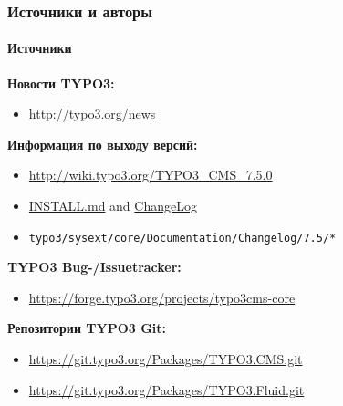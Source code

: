 \begin{frame}[fragile]
	\frametitle{Источники и авторы}
	\framesubtitle{Источники}

	\textbf{Новости TYPO3:}
		\begin{itemize}\smaller
			\item \url{http://typo3.org/news}
		\end{itemize}

	\textbf{Информация по выходу версий:}
		\begin{itemize}\smaller
			\item \url{http://wiki.typo3.org/TYPO3_CMS_7.5.0}
			\item \href{https://github.com/TYPO3/TYPO3.CMS/blob/master/INSTALL.md}{INSTALL.md} and \href{https://github.com/TYPO3/TYPO3.CMS/blob/master/ChangeLog}{ChangeLog}
			\item \texttt{typo3/sysext/core/Documentation/Changelog/7.5/*}
		\end{itemize}

	\textbf{TYPO3 Bug-/Issuetracker:}
		\begin{itemize}\smaller
			\item \url{https://forge.typo3.org/projects/typo3cms-core}
		\end{itemize}

	\textbf{Репозитории TYPO3 Git:}
		\begin{itemize}\smaller
			\item \url{https://git.typo3.org/Packages/TYPO3.CMS.git}
			\item \url{https://git.typo3.org/Packages/TYPO3.Fluid.git}
		\end{itemize}

\end{frame}


